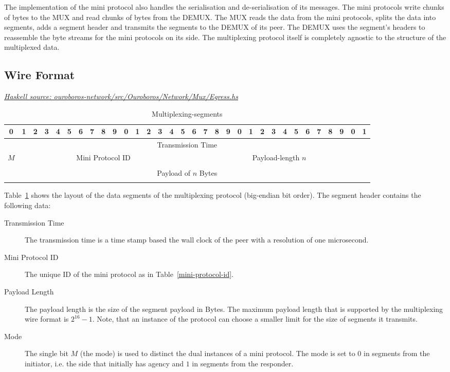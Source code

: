 \documentclass{report}
\newcommand{\hsref}[1]{\href{https://github.com/input-output-hk/ouroboros-network/blob/master/#1}{\emph{Haskell source: #1}}}
\theoremstyle{definition}{
  \newtheorem{lemma}{Lemma}[section] %
  \newtheorem{definition}[lemma]{Definition}
}
\theoremstyle{theorem}{
  \newtheorem{invariant}[lemma]{Invariant}
  \newtheorem{proofobligation}[lemma]{Proof Obligation}
}
\numberwithin{equation}{lemma}
\begin{document}
The implementation of the mini protocol also handles the serialisation and de-serialisation of its messages.
The mini protocols write chunks of bytes to the MUX and read chunks of bytes from the DEMUX.
The MUX reads the data from the mini protocols, splits the data into segments, adds a segment header
and transmits the segments to the DEMUX of its peer.
The DEMUX uses the segment's headers to reassemble the byte streams for the mini protocols on its side.
The multiplexing protocol itself is completely agnostic to the structure of the multiplexed data.

\subsection{Wire Format}
\hsref{ouroboros-network/src/Ouroboros/Network/Mux/Egress.hs}
\begin{table}[h]
\centering
\begingroup
\setlength{\tabcolsep}{3pt}
\begin{tabular}{|c|c|c|c|c|c|c|c|c|c|c|c|c|c|c|c|c|c|c|c|c|c|c|c|c|c|c|c|c|c|c|c|}
  \hline
  0&1&2&3&4&5&6&7&8&9&0&1&2&3&4&5&6&7&8&9&0&1&2&3&4&5&6&7&8&9&0&1 \\ \hline
  \multicolumn{32}{|c|}{Transmission Time} \\ \hline
  \multicolumn{1}{|c|}{$M$}
  &\multicolumn{15}{|c|}{Mini Protocol ID}
  &\multicolumn{16}{|c|}{Payload-length $n$} \\ \hline
  \multicolumn{32}{|c|}{} \\
  \multicolumn{32}{|c|}{Payload of $n$ Bytes} \\
  \multicolumn{32}{|c|}{} \\ \hline
\end{tabular}
\endgroup
\caption{Multiplexing-segments}
\label{segment-header}
\end{table}

Table~\ref{segment-header} shows the layout of the data segments of the multiplexing protocol
(big-endian bit order).
The segment header contains the following data:
\begin{description}
\item[Transmission Time]
  The transmission time is a time stamp based the wall clock of the peer with a
  resolution of one microsecond.
\item[Mini Protocol ID] The unique ID of the mini protocol as in Table~\ref{mini-protocol-id}.
\item[Payload Length] The payload length is the size of the segment payload in Bytes.
  The maximum payload length that is supported by the multiplexing wire format is $2^{16}-1$.
  Note, that an instance of the protocol can choose a smaller limit for the size of segments it transmits.
\item[Mode] The single bit $M$ (the mode) is used to distinct the dual instances of a mini protocol.
  The mode is set to $0$ in segments from the initiator, i.e. the side that initially has agency and
  $1$ in segments from the responder.
\end{description}
\end{document}
